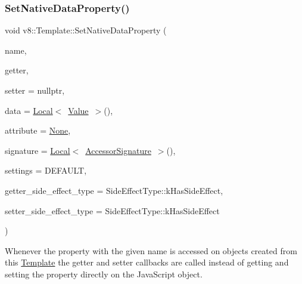 \subsubsection{\texorpdfstring{Set\+Native\+Data\+Property()}{SetNativeDataProperty()}}
{\footnotesize\ttfamily void v8\+::\+Template\+::\+Set\+Native\+Data\+Property (\begin{DoxyParamCaption}\item[{\mbox{\hyperlink{classv8_1_1Local}{Local}}$<$ \mbox{\hyperlink{classv8_1_1String}{String}} $>$}]{name,  }\item[{\mbox{\hyperlink{namespacev8_a722613c87061708a4f1aa050d095f868}{Accessor\+Getter\+Callback}}}]{getter,  }\item[{Accessor\+Setter\+Callback}]{setter = {\ttfamily nullptr},  }\item[{\mbox{\hyperlink{classv8_1_1Local}{Local}}$<$ \mbox{\hyperlink{classv8_1_1Value}{Value}} $>$}]{data = {\ttfamily \mbox{\hyperlink{classv8_1_1Local}{Local}}$<$~\mbox{\hyperlink{classv8_1_1Value}{Value}}~$>$()},  }\item[{\mbox{\hyperlink{namespacev8_a05f25f935e108a1ea2d150e274602b87}{Property\+Attribute}}}]{attribute = {\ttfamily \mbox{\hyperlink{namespacev8_a05f25f935e108a1ea2d150e274602b87a7ab4d58719c33b3ea2dfaefa29b111df}{None}}},  }\item[{\mbox{\hyperlink{classv8_1_1Local}{Local}}$<$ \mbox{\hyperlink{classv8_1_1AccessorSignature}{Accessor\+Signature}} $>$}]{signature = {\ttfamily \mbox{\hyperlink{classv8_1_1Local}{Local}}$<$~\mbox{\hyperlink{classv8_1_1AccessorSignature}{Accessor\+Signature}}~$>$()},  }\item[{\mbox{\hyperlink{namespacev8_a31d8355cb043d7d2dda3f4a52760b64e}{Access\+Control}}}]{settings = {\ttfamily DEFAULT},  }\item[{\mbox{\hyperlink{namespacev8_a29711319c2b9fc7716d65faee2f7b9cb}{Side\+Effect\+Type}}}]{getter\+\_\+side\+\_\+effect\+\_\+type = {\ttfamily SideEffectType\+:\+:kHasSideEffect},  }\item[{\mbox{\hyperlink{namespacev8_a29711319c2b9fc7716d65faee2f7b9cb}{Side\+Effect\+Type}}}]{setter\+\_\+side\+\_\+effect\+\_\+type = {\ttfamily SideEffectType\+:\+:kHasSideEffect} }\end{DoxyParamCaption})}

Whenever the property with the given name is accessed on objects created from this \mbox{\hyperlink{classv8_1_1Template}{Template}} the getter and setter callbacks are called instead of getting and setting the property directly on the Java\+Script object.


